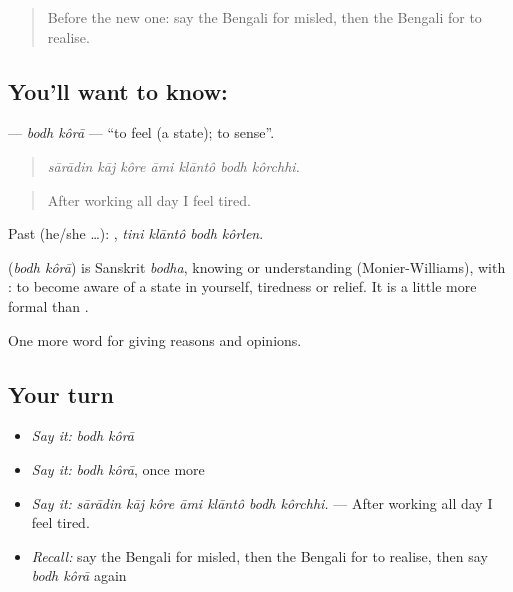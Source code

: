 \label{lesson:BN-C362-bodh-kora}



\begin{quote}
Before the new one: say the Bengali for misled, then the Bengali for to realise.
\end{quote}

\subsection*{You'll want to know:  }
\textbf{ } — \emph{bodh kôrā} — \textquotedblleft{}to feel (a state); to sense\textquotedblright{}.

\begin{quote}
      
\end{quote}

\begin{quote}
\emph{sārādin kāj kôre āmi klāntô bodh kôrchhi.}
\end{quote}

\begin{quote}
After working all day I feel tired.
\end{quote}

Past (he/she …):    , \emph{tini klāntô bodh kôrlen}.

\begin{cousinweb}
\textbf{ } (\emph{bodh kôrā}) is Sanskrit \emph{bodha}, knowing or understanding (Monier-Williams), with : to become aware of a state in yourself, tiredness or relief. It is a little more formal than  .
\end{cousinweb}

\begin{grammarlens}[title={What you've built}]
One more word for giving reasons and opinions.
\end{grammarlens}

\subsection*{Your turn}
\begin{itemize}
\raggedright
  \item \emph{Say it:} \emph{bodh kôrā}
  \item \emph{Say it:} \emph{bodh kôrā}, once more
  \item \emph{Say it:} \emph{sārādin kāj kôre āmi klāntô bodh kôrchhi.} — After working all day I feel tired.
  \item \emph{Recall:} say the Bengali for misled, then the Bengali for to realise, then say \emph{bodh kôrā} again
\end{itemize}

